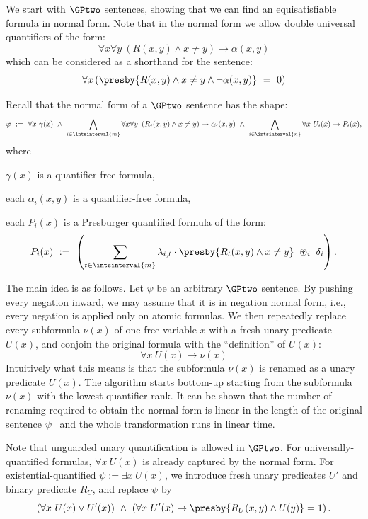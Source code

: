 We start with $\GPtwo$ sentences, showing that we can find an equisatisfiable formula in normal form.
Note that in the normal form we allow double universal quantifiers of the form:
$$
\forall x \forall y\ \left(R(x,y) \land x \neq y\right) \to \alpha(x, y)
$$
which can be considered as a shorthand for the  sentence:
$$
\forall x 
\left(
\presby{R(x, y) \land x \neq y\land \neg \alpha(x,y)}
\ =\ 0 
\right)
$$

Recall that the normal form of a $\GPtwo$ sentence has the shape:
\begin{equation*}
    \varphi\ :=\ 
    \forall x\ \gamma(x)\ \land\ 
    \bigwedge_{i \in \intsinterval{m}} \forall x \forall y\ \left(R_i(x,y) \land x \neq y\right) \to \alpha_i(x, y)\ \land\ 
    \bigwedge_{i \in \intsinterval{n}} \forall x\ U_i(x) \to P_i(x),
\end{equation*}
where
\begin{compactitem}
    \item $\gamma(x)$ is a quantifier-free formula,
    \item each $\alpha_i(x, y)$ is a quantifier-free formula,
    \item each $P_i(x)$ is a Presburger quantified formula of the form: 
    \begin{equation*}
        P_i(x)\ :=\ \left(
        \sum_{t \in \intsinterval{m}} \lambda_{i, t} \cdot \presby{R_t(x, y) \land x \neq y}
        \ \circledast_i\ \delta_i \right).
    \end{equation*}
\end{compactitem}

The main idea is as follows.
Let $\psi$ be an arbitrary $\GPtwo$ sentence.
By pushing every negation inward, we may assume that it is in negation normal form,
i.e., every negation is applied only on atomic formulas.
We then repeatedly replace every subformula $\nu(x)$ of one free variable $x$ with a fresh unary predicate $U(x)$, and conjoin the original formula with the ``definition'' of $U(x)$:
$$
\forall x \ U(x) \to \nu(x)
$$
Intuitively what this means is that
the subformula $\nu(x)$ is renamed as a unary predicate $U(x)$.
The algorithm starts bottom-up starting from the subformula $\nu(x)$
with the lowest quantifier rank.
It can be shown that the number of renaming required to obtain the normal form is linear in the length of the original sentence $\psi$~\cite[Lemma 3.3]{twovarpres} and the whole transformation runs in linear time.

Note that unguarded unary quantification is allowed in $\GPtwo$.
For universally-quantified formulas, $\forall x\ U(x)$ is already captured by the normal form.
For existential-quantified $\psi := \exists x\ U(x)$,
we introduce fresh unary predicates $U'$ and binary predicate $R_U$, and replace $\psi$ by 
\begin{equation*}
    \left(
        \forall x\ U(x) \lor U'(x)
    \right)
    \ \land\ 
    \left(
        \forall x\ U'(x) \to \presby{R_U(x, y) \land U(y)} = 1
    \right).
\end{equation*}


